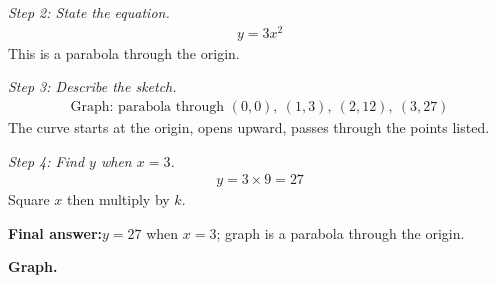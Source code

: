 \documentclass[11pt]{article}
\begin{document}
\textit{Step 2: State the equation.}
\[\begin{gathered}
y = 3x^2
\end{gathered}\]
This is a parabola through the origin.

\textit{Step 3: Describe the sketch.}
\[\begin{gathered}
\text{Graph: parabola through } (0,0),\ (1,3),\ (2,12),\ (3,27)
\end{gathered}\]
The curve starts at the origin, opens upward, passes through the points listed.

\textit{Step 4: Find \( y \) when \( x = 3 \).}
\[\begin{gathered}
y = 3 \times 9 = 27
\end{gathered}\]
Square \( x \) then multiply by \( k \).

\begin{answerbox}
\textbf{Final answer:}\quad \(\displaystyle  y = 27 \) when \(\displaystyle  x = 3 \); graph is a parabola through the origin.
\end{answerbox}
\textbf{Graph.}
\end{document}
